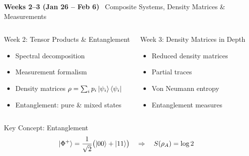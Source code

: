 \documentclass[aspectratio=169,10pt]{beamer}
\newcommand{\week}[1]{\textcolor{blue!60!black}{\textbf{#1}}}
\begin{document}
\begin{frame}{\week{Weeks 2--3 (Jan 26 -- Feb 6)} \ Composite Systems, Density Matrices \& Measurements}
  \begin{columns}[T]
      \begin{block}{Week 2: Tensor Products \& Entanglement}
        \begin{itemize}
          \item Spectral decomposition
          \item Measurement formalism
          \item Density matrices $\rho = \sum_i p_i \ket{\psi_i}\bra{\psi_i}$
          \item Entanglement: pure \& mixed states
        \end{itemize}
      \end{block}
      \begin{block}{Week 3: Density Matrices in Depth}
        \begin{itemize}
          \item Reduced density matrices
          \item Partial traces
          \item Von Neumann entropy
          \item Entanglement measures
        \end{itemize}
      \end{block}
  \end{columns}
  \vspace{6pt}
  \begin{block}{Key Concept: Entanglement}
    \[
      \ket{\Phi^+} = \frac{1}{\sqrt{2}}\bigl(\ket{00}+\ket{11}\bigr)
      \quad\Rightarrow\quad S(\rho_A) = \log 2
    \]
  \end{block}
\end{frame}
\end{document}
